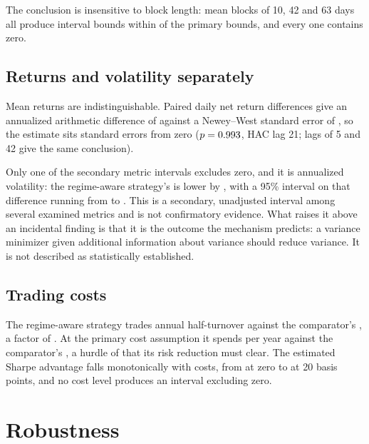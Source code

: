 The conclusion is insensitive to block length: mean blocks of 10, 42 and
63 days all produce interval bounds within \blockMaxDeviation{} of the
primary bounds, and every one contains zero.

\subsection{Returns and volatility separately}

Mean returns are indistinguishable. Paired daily net return differences
give an annualized arithmetic difference of \hacAnnualReturnDiff{}
against a Newey--West standard error of \hacStandardError{}, so the
estimate sits \hacSdsFromZero{} standard errors from zero
($p = 0.993{}$, HAC lag 21; lags of 5 and 42 give the same
conclusion).

Only one of the \nSecondaryMetrics{} secondary metric intervals excludes
zero, and it is annualized volatility: the regime-aware strategy's is
lower by \volDifferenceMagnitude{}, with a 95\% interval on that
difference running from \volCiLower{} to \volCiUpper{}. This is a secondary, unadjusted interval among several examined
metrics and is not confirmatory evidence. What raises it above an
incidental finding is that it is the outcome the mechanism predicts: a
variance minimizer given additional information about variance should
reduce variance. It is not described as statistically established.

\subsection{Trading costs}

The regime-aware strategy trades \regimeHalfTurnover{} annual
half-turnover against the comparator's \comparatorHalfTurnover{}, a
factor of \turnoverRatio{}. At the primary cost assumption it spends
\regimeCost{} per year against the comparator's \comparatorCost{}, a
hurdle of \costHurdle{} that its risk reduction must clear. The estimated
Sharpe advantage falls monotonically with costs, from \diffAtZeroBps{} at
zero to \diffAtTwentyBps{} at 20 basis points, and no cost level produces
an interval excluding zero.



\section{Robustness}
\label{sec:robustness}

